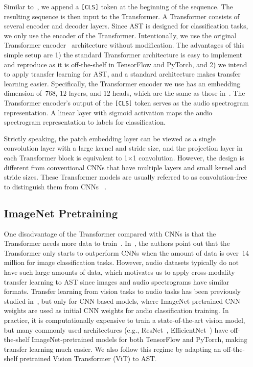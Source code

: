 \documentclass[a4paper]{article}
\begin{document}
Similar to~\cite{devlin2019bert}, we append a \texttt{[CLS]} token at the beginning of the sequence.
The resulting sequence is then input to the Transformer.
A Transformer consists of several encoder and decoder layers.
Since AST is designed for classification tasks, we only use the encoder of the Transformer.
Intentionally, we use the original Transformer encoder~\cite{vaswani2017attention} architecture without modification.
The advantages of this simple setup are 1) the standard Transformer architecture is easy to implement and reproduce as it is off-the-shelf in TensorFlow and PyTorch, and 2) we intend to apply transfer learning for AST, and a standard architecture makes transfer learning easier.
Specifically, the Transformer encoder we use has an embedding dimension of~768, 12 layers, and 12 heads, which are the same as those in~\cite{touvron2020deit,dosovitskiy2021image}.
The Transformer encoder's output of the \texttt{[CLS]} token serves as the audio spectrogram representation.
A linear layer with sigmoid activation maps the audio spectrogram representation to labels for classification. 

Strictly speaking, the patch embedding layer can be viewed as a single convolution layer with a large kernel and stride size, and the projection layer in each Transformer block is equivalent to 1$\times$1 convolution. However, the design is different from conventional CNNs that have multiple layers and small kernel and stride sizes. These Transformer models are usually referred to as convolution-free to distinguish them from CNNs ~\cite{dosovitskiy2021image,touvron2020deit}.

\subsection{ImageNet Pretraining}
\label{sec:pretrain}

One disadvantage of the Transformer compared with CNNs is that the Transformer needs more data to train~\cite{dosovitskiy2021image}. In~\cite{dosovitskiy2021image}, the authors point out that the Transformer only starts to outperform CNNs when the amount of data is over~14 million for image classification tasks. However, audio datasets typically do not have such large amounts of data, which motivates us to apply cross-modality transfer learning to AST since images and audio spectrograms have similar formats. Transfer learning from vision tasks to audio tasks has been previously studied in~\cite{gwardys2014deep,guzhov2020esresnet,palanisamy2020rethinking,gong2021psla}, but only for CNN-based models, where ImageNet-pretrained CNN weights are used as initial CNN weights for audio classification training. In practice, it is computationally expensive to train a state-of-the-art vision model, but many commonly used architectures (e.g., ResNet~\cite{he2016deep}, EfficientNet~\cite{tan2019efficientnet}) have off-the-shelf ImageNet-pretrained models for both TensorFlow and PyTorch, making transfer learning much easier. We also follow this regime by adapting an off-the-shelf pretrained Vision Transformer (ViT) to AST. 
\end{document}

